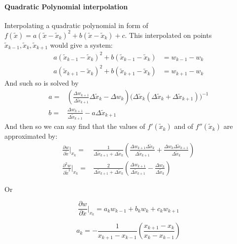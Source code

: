 \paragraph{Quadratic Polynomial interpolation}
Interpolating a quadratic polynomial in form of $f(\tilde x)=a(\tilde x-\tilde x_k)^2+b(\tilde x-\tilde x_k)+c$. This interpolated on points $\tilde x_{k-1},\tilde x_{k},\tilde x_{k+1}$ would give a system: 
\begin{equation}
\begin{split}
a(\tilde x_{k-1}-\tilde x_k)^2+b(\tilde x_{k-1}-\tilde x_k)&=w_{k-1}-w_{k}
\\
a(\tilde x_{k+1}-\tilde x_k)^2+b(\tilde x_{k+1}-\tilde x_k)&=w_{k+1}-w_{k}
\end{split}
\end{equation} 
And such so is solved by
\begin{equation}
\begin{split}
a=&\left(\frac{\Delta w_{k+1}}{\Delta \tilde x_{k+1}}\Delta \tilde x_{k}-\Delta w_{k}\right)
\big(\Delta \tilde x_{k}\left(\Delta \tilde x_{k}+\Delta \tilde x_{k+1}\right)\big)^{-1}
\\
b=&\frac{\Delta w_{k+1}}{\Delta \tilde x_{k+1}}-a\Delta \tilde x_{k+1}
\end{split}
\end{equation} 
And then so we can say find that the values of $f'(\tilde x_k)$ and of $f''(\tilde x_k)$ are approximated by:
\begin{equation}
\begin{split}\label{FD}
\frac{\partial w}{\partial \tilde x}|_{x_k}= &\frac{1}{\Delta \tilde x_{k+1}+\Delta \tilde x_{k}}
\left(\frac{\Delta w_{k+1}\Delta \tilde x_{k}}{\Delta \tilde x_{k+1}}
+\frac{\Delta w_{k}\Delta \tilde x_{k+1}}{\Delta \tilde x_{k}}\right)
\\
\frac{\partial^2 w}{\partial \tilde x^2}|_{x_k}=&\frac{2}{\Delta \tilde x_{k+1}+\Delta \tilde x_{k}}\left(\frac{\Delta w_{k+1}}{\Delta \tilde x_{k+1}}
-\frac{\Delta w_{k}}{\Delta \tilde x_{k}}\right)
\end{split}
\end{equation}

Or

\begin{equation}
\frac{\partial w}{\partial \tilde x}|_{x_k}=a_k w_{k-1}+b_k w_{k}+c_k w_{k+1}
\end{equation}

\begin{equation}
a_k=-\frac{1}{x_{k+1}-x_{k-1}}\left(\frac{x_{k+1}-x_{k}}{x_{k}-x_{k-1}}\right)
\end{equation}

